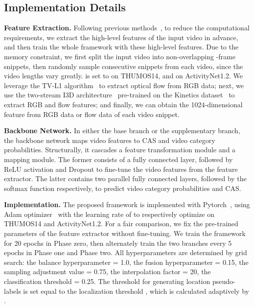 \documentclass[journal]{IEEEtran}
\begin{document}
\subsection{Implementation Details}
\noindent \textbf{Feature Extraction.} 
Following previous methods~\cite{zeng2019breaking,su2018cascaded,liu2019completeness}, to reduce the computational requirements, we extract the high-level features of the input video in advance, and then train the whole framework with these high-level features. Due to the memory constraint, we first split the input video into non-overlapping -frame snippets, then randomly sample  consecutive snippets from each video, since the video lengths vary greatly.  is set to  on THUMOS14, and  on ActivityNet1.2. We leverage the TV-L1 algorithm~\cite{wedel2009improved} to extract optical flow from RGB data; next, we use the two-stream I3D architecture~\cite{carreira2017quo} pre-trained on the Kinetics dataset~\cite{carreira2017quo} to extract RGB and flow features; and finally, we can obtain the 1024-dimensional feature from RGB data or flow data of each video snippet. 



\noindent \textbf{Backbone Network.}
In either the base branch or the supplementary branch, the backbone network maps video features to CAS and video category probabilities. Structurally, it cascades a feature transformation module and a mapping module. The former consists of a fully connected layer, followed by ReLU activation and Dropout to fine-tune the video features from the feature extractor. The latter contains two parallel fully connected layers, followed by the softmax function respectively, to predict video category probabilities and CAS.




\noindent \textbf{Implementation.}
The proposed framework is implemented with Pytorch~\cite{paszke2017automatic}, using Adam optimizer~\cite{kingma2014adam} with the learning rate of  to respectively optimize on THUMOS14 and ActivityNet1.2. For a fair comparison, we fix the pre-trained parameters of the feature extractor without fine-tuning. We train the framework for 20 epochs in Phase zero, then alternately train the two branches every 5 epochs in Phase one and Phase two. All hyperparameters are determined by grid search: the balance hyperparameter  = 1.0, the fusion hyperparameter  = 0.15, the sampling adjustment value  = 0.75, the interpolation factor  = 20, the classification threshold  = 0.25. The threshold  for generating location pseudo-labels is set equal to the localization threshold , which is calculated adaptively by .
\end{document}
